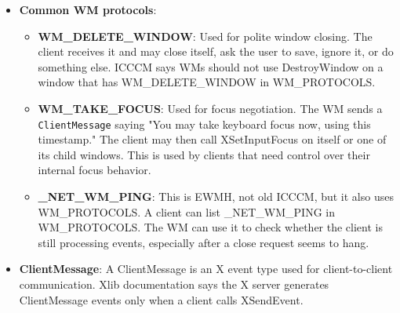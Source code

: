 \documentclass{report}
\begin{document}
\begin{itemize}
            \begin{cppcode}
            XKillClient(dpy, window);
            \end{cppcode}
            \bigbreak \noindent 
            or
            \bigbreak \noindent 
            \begin{cppcode}
            XDestroyWindow(dpy, window);
            \end{cppcode}
            \bigbreak \noindent 
            But that is rude. The application may need to ask the user to save a file, cancel a download, close a database connection, or reject the close.
            \bigbreak \noindent 
            So ICCCM defines WM\_DELETE\_WINDOW. If the client lists WM\_DELETE\_WINDOW in WM\_PROTOCOLS, the WM should send a message saying: "The user requested that you close." Then, the client decides what to do.
            \bigbreak \noindent 
            So, a protocol is a structured interaction.
    \item \textbf{Common WM protocols}: 
        \begin{itemize}
            \item \textbf{WM\_DELETE\_WINDOW}: Used for polite window closing. The client receives it and may close itself, ask the user to save, ignore it, or do something else. 
                \bigbreak \noindent 
                ICCCM says WMs should not use DestroyWindow on a window that has WM\_DELETE\_WINDOW in WM\_PROTOCOLS.
            \item \textbf{WM\_TAKE\_FOCUS}: Used for focus negotiation. The WM sends a \texttt{ClientMessage} saying "You may take keyboard focus now, using this timestamp."
                \bigbreak \noindent 
                The client may then call XSetInputFocus on itself or one of its child windows.
                \bigbreak \noindent 
                This is used by clients that need control over their internal focus behavior.
            \item \textbf{\_NET\_WM\_PING}: This is EWMH, not old ICCCM, but it also uses WM_PROTOCOLS.
                \bigbreak \noindent 
                A client can list \_NET\_WM\_PING in WM\_PROTOCOLS. The WM can use it to check whether the client is still processing events, especially after a close request seems to hang.
        \end{itemize}
    \item \textbf{ClientMessage}: A ClientMessage is an X event type used for client-to-client communication. Xlib documentation says the X server generates ClientMessage events only when a client calls XSendEvent.

\end{itemize}
\end{document}
